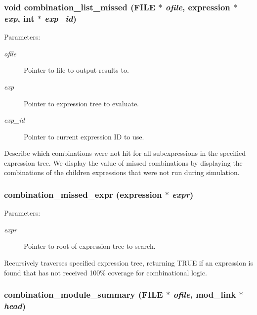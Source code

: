 \subsubsection{\setlength{\rightskip}{0pt plus 5cm}void combination\_\-list\_\-missed (FILE $\ast$ {\em ofile}, {\bf expression} $\ast$ {\em exp}, int $\ast$ {\em exp\_\-id})}\label{comb_8c_a10}


\begin{Desc}
\item[Parameters: ]\par
\begin{description}
\item[{\em 
ofile}]Pointer to file to output results to. \item[{\em 
exp}]Pointer to expression tree to evaluate. \item[{\em 
exp\_\-id}]Pointer to current expression ID to use.\end{description}
\end{Desc}
Describe which combinations were not hit for all subexpressions in the specified expression tree. We display the value of missed combinations by displaying the combinations of the children expressions that were not run during simulation. 
\subsubsection{ combination\_\-missed\_\-expr ({\bf expression} $\ast$ {\em expr})}\label{comb_8c_a11}


\begin{Desc}
\item[Parameters: ]\par
\begin{description}
\item[{\em 
expr}]Pointer to root of expression tree to search.\end{description}
\end{Desc}
Recursively traverses specified expression tree, returning TRUE if an expression is found that has not received 100\% coverage for combinational logic. 
\subsubsection{ combination\_\-module\_\-summary (FILE $\ast$ {\em ofile}, {\bf mod\_\-link} $\ast$ {\em head})}\label{comb_8c_a4}



